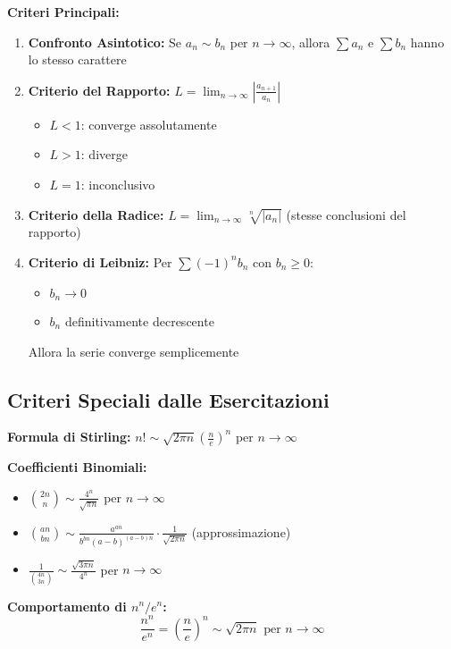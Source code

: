\begin{info}
\textbf{Criteri Principali:}
\begin{enumerate}
    \item \textbf{Confronto Asintotico:} Se $a_n \sim b_n$ per $n \to \infty$, allora $\sum a_n$ e $\sum b_n$ hanno lo stesso carattere
    \item \textbf{Criterio del Rapporto:} $L = \lim_{n \to \infty} \left|\frac{a_{n+1}}{a_n}\right|$
        \begin{itemize}
            \item $L < 1$: converge assolutamente
            \item $L > 1$: diverge
            \item $L = 1$: inconclusivo
        \end{itemize}
    \item \textbf{Criterio della Radice:} $L = \lim_{n \to \infty} \sqrt[n]{|a_n|}$ (stesse conclusioni del rapporto)
    \item \textbf{Criterio di Leibniz:} Per $\sum (-1)^n b_n$ con $b_n \geq 0$:
        \begin{itemize}
            \item $b_n \to 0$
            \item $b_n$ definitivamente decrescente
        \end{itemize}
        Allora la serie converge semplicemente
\end{enumerate}
\end{info}

\subsection{Criteri Speciali dalle Esercitazioni}

\begin{info}
\textbf{Formula di Stirling:} $n! \sim \sqrt{2\pi n}\left(\frac{n}{e}\right)^n$ per $n \to \infty$

\textbf{Coefficienti Binomiali:}
\begin{itemize}
    \item $\binom{2n}{n} \sim \frac{4^n}{\sqrt{\pi n}}$ per $n \to \infty$
    \item $\binom{an}{bn} \sim \frac{a^{an}}{b^{bn}(a-b)^{(a-b)n}} \cdot \frac{1}{\sqrt{2\pi n}}$ (approssimazione)
    \item $\frac{1}{\binom{4n}{3n}} \sim \frac{\sqrt{3\pi n}}{4^n}$ per $n \to \infty$
\end{itemize}

\textbf{Comportamento di $n^n/e^n$:}
\[ \frac{n^n}{e^n} = \left(\frac{n}{e}\right)^n \sim \sqrt{2\pi n} \text{ per } n \to \infty \]
\end{info}

